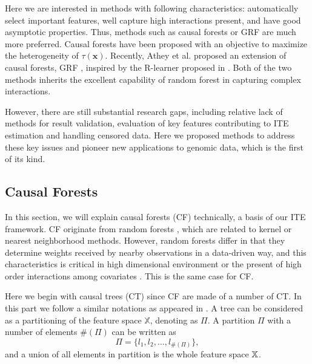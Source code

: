     Here we are interested in methods with following characteristics: automatically select important features, well capture high interactions present, and have good asymptotic properties. Thus, methods such as causal forests \cite{wager2018estimation} or GRF \cite{athey2019generalized} are much more preferred. Causal forests \cite{wager2018estimation} have been proposed with an objective to maximize the heterogeneity of $\tau(\mathbf{x})$. Recently, Athey et al. proposed an extension of causal forests, GRF \cite{athey2019generalized}, inspired by the R-learner proposed in \cite{nie2017quasi}. Both of the two methods \cite{wager2018estimation,athey2019generalized} inherits the excellent capability of random forest in capturing complex interactions. 
    
    However, there are still substantial research gaps, including relative lack of methods for result validation, evaluation of key features contributing to ITE estimation and handling censored data. Here we proposed methods to address these key issues and pioneer new applications to genomic data, which is the first of its kind.

  \subsection{Causal Forests}
  \label{sec:ite_cf}
    In this section, we will explain causal forests (CF) technically, a basis of our ITE framework. CF \cite{wager2018estimation} originate from random forests \cite{breiman2001random}, which are related to kernel  or nearest neighborhood methods. However, random forests differ in that they determine weights received by nearby observations in a data-driven way, and this characteristics is critical in high dimensional environment or the present of high order interactions among covariates \cite{wager2018estimation}. This is the same case for CF. 
    
    Here we begin with causal trees (CT) \cite{athey2016recursive} since CF are made of a number of CT. In this part we follow a similar notations as appeared in \cite{athey2016recursive}. A tree can be considered as a partitioning of the feature space $\mathbb{X}$, denoting as $\Pi$. A partition $\Pi$ with a number of elements $\#(\Pi)$ can be written as 
    \begin{equation*}
      \Pi = \{ l_1, l_2, \dots, l_{\#(\Pi)} \}, 
    \end{equation*}
    and a union of all elements in partition is the whole feature space $\mathbb{X}$.


